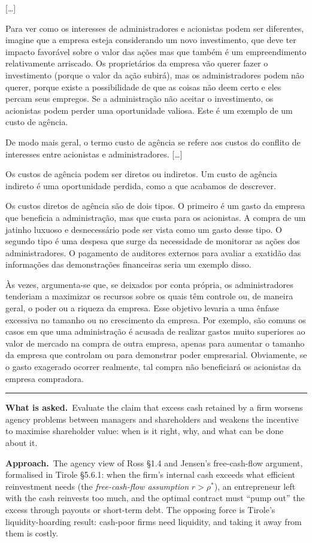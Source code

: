\documentclass[11pt,a4paper]{article}
\newcommand{\asked}{\par\medskip\noindent\textbf{What is asked.}~}
\newcommand{\approach}{\par\smallskip\noindent\textbf{Approach.}~}
\newcommand{\stmtend}{\par\endgroup\nopagebreak\noindent\rule{\linewidth}{0.4pt}\par\medskip}
\begin{document}
{[}\ldots{]}

Para ver como os interesses de administradores e acionistas podem ser diferentes, imagine que a
empresa esteja considerando um novo investimento, que deve ter impacto favorável sobre o valor das
ações mas que também é um empreendimento relativamente arriscado. Os proprietários da empresa vão
querer fazer o investimento (porque o valor da ação subirá), mas os administradores podem não
querer, porque existe a possibilidade de que as coisas não deem certo e eles percam seus empregos.
Se a administração não aceitar o investimento, os acionistas podem perder uma oportunidade valiosa.
Este é um exemplo de um custo de agência.

De modo mais geral, o termo custo de agência se refere aos custos do conflito de interesses entre
acionistas e administradores. {[}\ldots{]}

Os custos de agência podem ser diretos ou indiretos. Um custo de agência indireto é uma oportunidade
perdida, como a que acabamos de descrever.

Os custos diretos de agência são de dois tipos. O primeiro é um gasto da empresa que beneficia a
administração, mas que custa para os acionistas. A compra de um jatinho luxuoso e desnecessário pode
ser vista como um gasto desse tipo. O segundo tipo é uma despesa que surge da necessidade de
monitorar as ações dos administradores. O pagamento de auditores externos para avaliar a exatidão
das informações das demonstrações financeiras seria um exemplo disso.

Às vezes, argumenta-se que, se deixados por conta própria, os administradores tenderiam a maximizar
os recursos sobre os quais têm controle ou, de maneira geral, o poder ou a riqueza da empresa. Esse
objetivo levaria a uma ênfase excessiva no tamanho ou no crescimento da empresa. Por exemplo, são
comuns os casos em que uma administração é acusada de realizar gastos muito superiores ao valor de
mercado na compra de outra empresa, apenas para aumentar o tamanho da empresa que controlam ou para
demonstrar poder empresarial. Obviamente, se o gasto exagerado ocorrer realmente, tal compra não
beneficiará os acionistas da empresa compradora.
\stmtend

\asked Evaluate the claim that excess cash retained by a firm worsens agency problems between managers and shareholders and weakens the incentive to maximise shareholder value: when is it right, why, and what can be done about it.

\approach The agency view of Ross \S 1.4 and Jensen's free-cash-flow argument, formalised in Tirole \S 5.6.1: when the firm's internal cash exceeds what efficient reinvestment needs (the \emph{free-cash-flow assumption} $r>\rho^*$), an entrepreneur left with the cash reinvests too much, and the optimal contract must ``pump out'' the excess through payouts or short-term debt. The opposing force is Tirole's liquidity-hoarding result: cash-poor firms need liquidity, and taking it away from them is costly.
\end{document}
